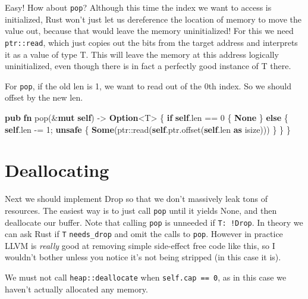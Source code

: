 \documentclass[a4paper,]{book}
\newenvironment{Shaded}{\begin{snugshade}}{\end{snugshade}}
\newcommand{\KeywordTok}[1]{\textcolor[rgb]{0.13,0.29,0.53}{\textbf{{#1}}}}
\newcommand{\DecValTok}[1]{\textcolor[rgb]{0.00,0.00,0.81}{{#1}}}
\newcommand{\NormalTok}[1]{{#1}}
\begin{document}
Easy! How about \texttt{pop}? Although this time the index we want to
access is initialized, Rust won't just let us dereference the location
of memory to move the value out, because that would leave the memory
uninitialized! For this we need \texttt{ptr::read}, which just copies
out the bits from the target address and interprets it as a value of
type T. This will leave the memory at this address logically
uninitialized, even though there is in fact a perfectly good instance of
T there.

For \texttt{pop}, if the old len is 1, we want to read out of the 0th
index. So we should offset by the new len.

\begin{Shaded}
\begin{Highlighting}[]
\KeywordTok{pub} \KeywordTok{fn} \NormalTok{pop(&}\KeywordTok{mut} \KeywordTok{self}\NormalTok{) -> }\KeywordTok{Option}\NormalTok{<T> \{}
    \KeywordTok{if} \KeywordTok{self}\NormalTok{.len == }\DecValTok{0} \NormalTok{\{}
        \KeywordTok{None}
    \NormalTok{\} }\KeywordTok{else} \NormalTok{\{}
        \KeywordTok{self}\NormalTok{.len -= }\DecValTok{1}\NormalTok{;}
        \KeywordTok{unsafe} \NormalTok{\{}
            \KeywordTok{Some}\NormalTok{(ptr::read(}\KeywordTok{self}\NormalTok{.ptr.offset(}\KeywordTok{self}\NormalTok{.len }\KeywordTok{as} \NormalTok{isize)))}
        \NormalTok{\}}
    \NormalTok{\}}
\NormalTok{\}}
\end{Highlighting}
\end{Shaded}

\section{Deallocating}\label{sec--vec-dealloc}

Next we should implement Drop so that we don't massively leak tons of
resources. The easiest way is to just call \texttt{pop} until it yields
None, and then deallocate our buffer. Note that calling \texttt{pop} is
unneeded if \texttt{T:\ !Drop}. In theory we can ask Rust if \texttt{T}
\texttt{needs\_drop} and omit the calls to \texttt{pop}. However in
practice LLVM is \emph{really} good at removing simple side-effect free
code like this, so I wouldn't bother unless you notice it's not being
stripped (in this case it is).

We must not call \texttt{heap::deallocate} when
\texttt{self.cap\ ==\ 0}, as in this case we haven't actually allocated
any memory.
\end{document}
